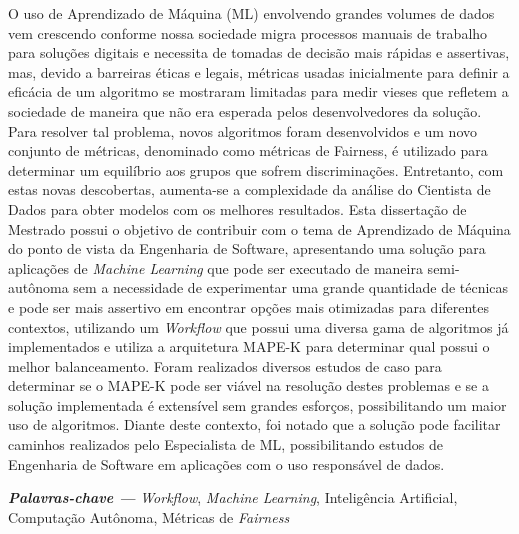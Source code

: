 \documentclass[portugues]{ic-tese}
\providecommand{\palavraschave}[1]
{
  \small	
  \textbf{\textit{Palavras-chave ---}} #1
}
\begin{document}
\begin{resumo}
O uso de Aprendizado de Máquina (ML) envolvendo grandes volumes de dados vem crescendo conforme nossa sociedade migra processos manuais de trabalho para soluções digitais e necessita de tomadas de decisão mais rápidas e assertivas, mas, devido a barreiras éticas e legais, métricas usadas inicialmente para definir a eficácia de um algoritmo se mostraram limitadas para medir vieses que refletem a sociedade de maneira que não era esperada pelos desenvolvedores da solução. Para resolver tal problema, novos algoritmos foram desenvolvidos e um novo conjunto de métricas, denominado como métricas de Fairness, é utilizado para determinar um equilíbrio aos grupos que sofrem discriminações. Entretanto, com estas novas descobertas, aumenta-se a complexidade da análise do Cientista de Dados para obter modelos com os melhores resultados. Esta dissertação de Mestrado possui o objetivo de contribuir com o tema de Aprendizado de Máquina do ponto de vista da Engenharia de Software, apresentando uma solução para aplicações de \textit{Machine Learning} que pode ser executado de maneira semi-autônoma sem a necessidade de experimentar uma grande quantidade de técnicas e pode ser mais assertivo em encontrar opções mais otimizadas para diferentes contextos, utilizando um \textit{Workflow} que possui uma diversa gama de algoritmos já implementados e utiliza a arquitetura MAPE-K para determinar qual possui o melhor balanceamento. Foram realizados diversos estudos de caso para determinar se o MAPE-K pode ser viável na resolução destes problemas e se a solução implementada é extensível sem grandes esforços, possibilitando um maior uso de algoritmos. Diante deste contexto, foi notado que a solução pode facilitar caminhos realizados pelo Especialista de ML, possibilitando estudos de Engenharia de Software em aplicações com o uso responsável de dados.

\palavraschave{\textit{Workflow}, \textit{Machine Learning}, Inteligência Artificial, Computação Autônoma, Métricas de \textit{Fairness}}
\end{resumo}
\end{document}

